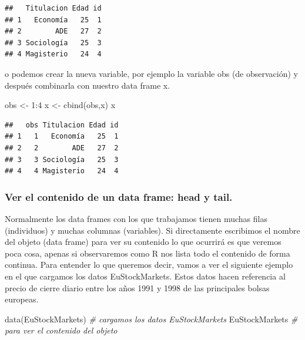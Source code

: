 \documentclass[
]{book}
\newenvironment{Shaded}{\begin{snugshade}}{\end{snugshade}}
\newcommand{\CommentTok}[1]{\textcolor[rgb]{0.56,0.35,0.01}{\textit{#1}}}
\newcommand{\DecValTok}[1]{\textcolor[rgb]{0.00,0.00,0.81}{#1}}
\newcommand{\FunctionTok}[1]{\textcolor[rgb]{0.00,0.00,0.00}{#1}}
\newcommand{\NormalTok}[1]{#1}
\newcommand{\OtherTok}[1]{\textcolor[rgb]{0.56,0.35,0.01}{#1}}
\newcommand{\SpecialCharTok}[1]{\textcolor[rgb]{0.00,0.00,0.00}{#1}}
\begin{document}
\begin{verbatim}
##   Titulacion Edad id
## 1   Economía   25  1
## 2        ADE   27  2
## 3 Sociología   25  3
## 4 Magisterio   24  4
\end{verbatim}

o podemos crear la nueva variable, por ejemplo la variable obs (de observación) y después combinarla con nuestro data frame x.

\begin{Shaded}
\begin{Highlighting}[]
\NormalTok{obs }\OtherTok{\textless{}{-}} \DecValTok{1}\SpecialCharTok{:}\DecValTok{4}
\NormalTok{x }\OtherTok{\textless{}{-}} \FunctionTok{cbind}\NormalTok{(obs,x)}
\NormalTok{x}
\end{Highlighting}
\end{Shaded}

\begin{verbatim}
##   obs Titulacion Edad id
## 1   1   Economía   25  1
## 2   2        ADE   27  2
## 3   3 Sociología   25  3
## 4   4 Magisterio   24  4
\end{verbatim}

\hypertarget{ver-el-contenido-de-un-data-frame-head-y-tail.}{%
\subsubsection{Ver el contenido de un data frame: head y tail.}\label{ver-el-contenido-de-un-data-frame-head-y-tail.}}

Normalmente los data frames con los que trabajamos tienen muchas filas (individuos) y muchas columnas (variables). Si directamente escribimos el nombre del objeto (data frame) para ver su contenido lo que ocurrirá es que veremos poca cosa, apenas si observaremos como R nos lista todo el contenido de forma continua. Para entender lo que queremos decir, vamos a ver el siguiente ejemplo en el que cargamos los datos EuStockMarkets. Estos datos hacen referencia al precio de cierre diario entre los años 1991 y 1998 de las principales bolsas europeas.

\begin{Shaded}
\begin{Highlighting}[]
\FunctionTok{data}\NormalTok{(EuStockMarkets)        }\CommentTok{\# cargamos los datos EuStockMarkets}
\NormalTok{EuStockMarkets              }\CommentTok{\# para ver el contenido del objeto}
\end{Highlighting}
\end{Shaded}
\end{document}
